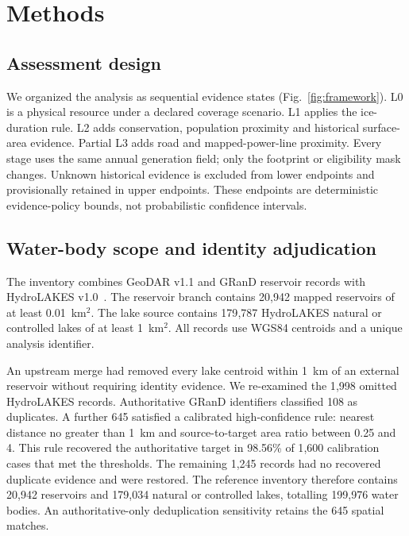 \section{Methods}

\subsection{Assessment design}

We organized the analysis as sequential evidence states (Fig.~\ref{fig:framework}). L0 is a physical resource under a declared coverage scenario. L1 applies the ice-duration rule. L2 adds conservation, population proximity and historical surface-area evidence. Partial L3 adds road and mapped-power-line proximity. Every stage uses the same annual generation field; only the footprint or eligibility mask changes. Unknown historical evidence is excluded from lower endpoints and provisionally retained in upper endpoints. These endpoints are deterministic evidence-policy bounds, not probabilistic confidence intervals.

\subsection{Water-body scope and identity adjudication}

The inventory combines GeoDAR v1.1 and GRanD reservoir records with HydroLAKES v1.0~\citep{wang2022geodar,lehner2011,messager2016}. The reservoir branch contains 20{,}942 mapped reservoirs of at least 0.01~km$^2$. The lake source contains 179{,}787 HydroLAKES natural or controlled lakes of at least 1~km$^2$. All records use WGS84 centroids and a unique analysis identifier.

An upstream merge had removed every lake centroid within 1~km of an external reservoir without requiring identity evidence. We re-examined the 1{,}998 omitted HydroLAKES records. Authoritative GRanD identifiers classified 108 as duplicates. A further 645 satisfied a calibrated high-confidence rule: nearest distance no greater than 1~km and source-to-target area ratio between 0.25 and 4. This rule recovered the authoritative target in 98.56\% of 1{,}600 calibration cases that met the thresholds. The remaining 1{,}245 records had no recovered duplicate evidence and were restored. The reference inventory therefore contains 20{,}942 reservoirs and 179{,}034 natural or controlled lakes, totalling 199{,}976 water bodies. An authoritative-only deduplication sensitivity retains the 645 spatial matches.

